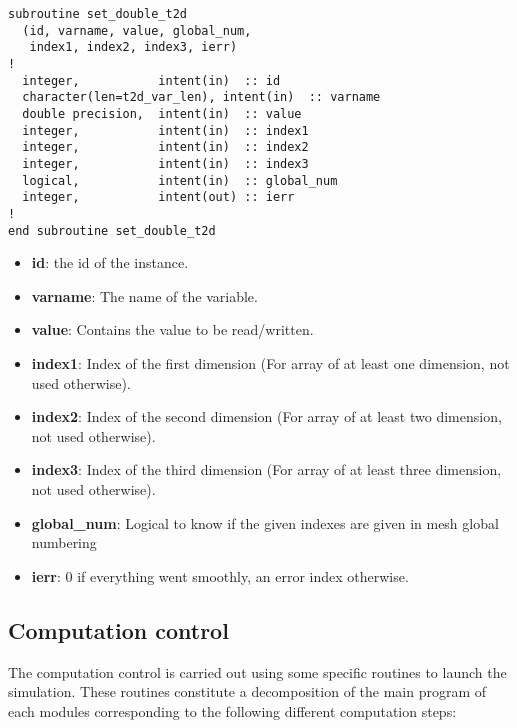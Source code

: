 \begin{itemize}
\begin{lstlisting}
subroutine set_double_t2d
  (id, varname, value, global_num,
   index1, index2, index3, ierr)
!
  integer,           intent(in)  :: id
  character(len=t2d_var_len), intent(in)  :: varname
  double precision,  intent(in)  :: value
  integer,           intent(in)  :: index1
  integer,           intent(in)  :: index2
  integer,           intent(in)  :: index3
  logical,           intent(in)  :: global_num
  integer,           intent(out) :: ierr
!
end subroutine set_double_t2d
\end{lstlisting}

\begin{itemize}
\item \textbf{id}: the id of the instance.
\item \textbf{varname}: The name of the variable.
\item \textbf{value}: Contains the value to be read/written.
\item \textbf{index1}: Index of the first dimension (For array of at least one
  dimension, not used otherwise).
\item \textbf{index2}: Index of the second dimension (For array of at least two
  dimension, not used otherwise).
\item \textbf{index3}: Index of the third dimension (For array of at least
  three dimension, not used otherwise).
\item \textbf{global\_num}: Logical to know if the given indexes are given in
  mesh global numbering
\item \textbf{ierr}: 0 if everything went smoothly, an error index otherwise.
\end{itemize}

\end{itemize}

\subsection{Computation control}
\label{subsec:exec}
The computation control is carried out using some specific routines to launch
the simulation. These routines constitute a decomposition of the main program
of each \telemacsystem modules corresponding to the following different
computation steps:

